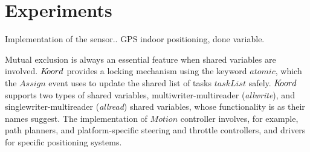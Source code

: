 \section{Experiments}
Implementation of the sensor.. GPS indoor positioning, done variable. 
%

Mutual exclusion is always an essential feature when shared variables are involved. $K\kern-2pt oord$ provides a locking mechanism using the keyword $\mathit{atomic}$, which the $\mathit{Assign}$ event uses to update the shared list of tasks $\mathit{taskList}$ safely. $K\kern-2pt oord$ supports two types of shared variables, multiwriter-multireader (\emph{allwrite}), and singlewriter-multireader (\emph{allread}) shared variables, whose functionality is as their names suggest. 
The implementation of $\mathit{Motion}$ controller involves, for example, path planners, and platform-specific steering and throttle controllers, and drivers for specific positioning systems. 